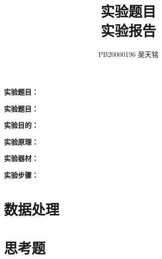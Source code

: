 \documentclass[fontsize=12pt]{article}
\title{实验题目\\\Large{实验报告}}
\author{PB20000196 吴天铭}
\begin{document}
  \maketitle

  \begin{labeling}{\textbf{实验题目：}}
    \item[\textbf{实验题目：}]
    \item[\textbf{实验目的：}]
    \item[\textbf{实验原理：}]
    \item[\textbf{实验器材：}]
    \item[\textbf{实验步骤：}]
  \end{labeling}

  \section*{数据处理}

  \section*{思考题}
\end{document}
